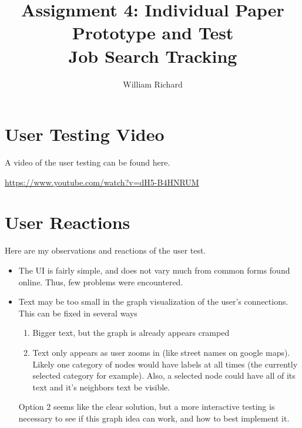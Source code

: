 \documentclass[12pt, letter]{article}
\title{Assignment 4: Individual Paper Prototype and Test \\ Job Search Tracking}
\author{William Richard}
\begin{document}
\maketitle

\section{User Testing Video}

A video of the user testing can be found here.

\url{https://www.youtube.com/watch?v=dH5-B4HNRUM}

\section{User Reactions}
Here are my observations and reactions of the user test.

\begin{itemize}
\item The UI is fairly simple, and does not vary much from common forms found online.  Thus, few problems were encountered.
\item Text may be too small in the graph visualization of the user's connections.  This can be fixed in several ways
\begin {enumerate}
\item Bigger text, but the graph is already appears cramped
\item Text only appears as user zooms in (like street names on google maps).  Likely one category of nodes would have labels at all times (the currently selected category for example).  Also, a selected node could have all of its text and it's neighbors text be visible.
\end{enumerate}
Option 2 seems like the clear solution, but a more interactive testing is necessary to see if this graph idea can work, and how to best implement it.

\end{itemize}
\end{document}
